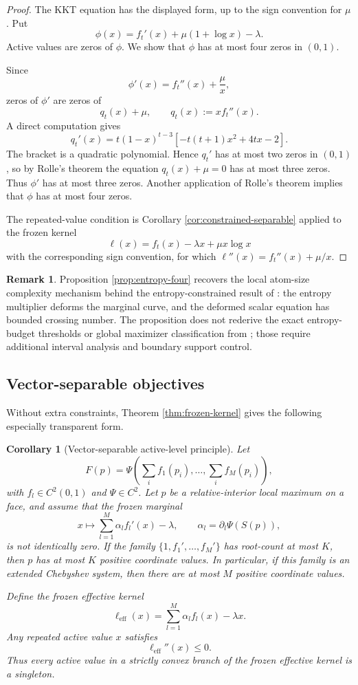 \documentclass[11pt]{article}
\newtheorem{corollary}[theorem]{Corollary}
\theoremstyle{definition}
\newtheorem{remark}[theorem]{Remark}
\begin{document}
\begin{proof}
The KKT equation has the displayed form, up to the sign convention for $\mu$.  Put
\[
  \phi(x)=f_t'(x)+\mu(1+\log x)-\lambda.
\]
Active values are zeros of $\phi$.  We show that $\phi$ has at most four zeros in $(0,1)$.

Since
\[
  \phi'(x)=f_t''(x)+\frac{\mu}{x},
\]
zeros of $\phi'$ are zeros of
\[
  q_t(x)+\mu,
  \qquad
  q_t(x):=x f_t''(x).
\]
A direct computation gives
\[
  q_t'(x)=t(1-x)^{t-3}
  \left[-t(t+1)x^2+4t x-2\right].
\]
The bracket is a quadratic polynomial.  Hence $q_t'$ has at most two zeros in $(0,1)$, so by Rolle's theorem the equation $q_t(x)+\mu=0$ has at most three zeros.  Thus $\phi'$ has at most three zeros.  Another application of Rolle's theorem implies that $\phi$ has at most four zeros.

The repeated-value condition is Corollary \ref{cor:constrained-separable} applied to the frozen kernel
\[
  \ell(x)=f_t(x)-\lambda x+\mu x\log x
\]
with the corresponding sign convention, for which $\ell''(x)=f_t''(x)+\mu/x$.
\end{proof}

\begin{remark}
Proposition \ref{prop:entropy-four} recovers the local atom-size complexity mechanism behind the entropy-constrained result of \cite{BKZ}: the entropy multiplier deforms the marginal curve, and the deformed scalar equation has bounded crossing number.  The proposition does not rederive the exact entropy-budget thresholds or global maximizer classification from \cite{BKZ}; those require additional interval analysis and boundary support control.
\end{remark}

\subsection{Vector-separable objectives}

Without extra constraints, Theorem \ref{thm:frozen-kernel} gives the following especially transparent form.

\begin{corollary}[Vector-separable active-level principle]\label{cor:vector-separable}
Let
\[
  F(p)=\Psi\left(\sum_i f_1(p_i),\ldots,\sum_i f_M(p_i)\right),
\]
with $f_l\in C^2(0,1)$ and $\Psi\in C^2$.  Let $p$ be a relative-interior local maximum on a face, and assume that the frozen marginal
\[
  x\mapsto \sum_{l=1}^M \alpha_l f_l'(x)-\lambda,
  \qquad
  \alpha_l=\partial_l\Psi(S(p)),
\]
is not identically zero.  If the family $\{1,f_1',\ldots,f_M'\}$ has root-count at most $K$, then $p$ has at most $K$ positive coordinate values.  In particular, if this family is an extended Chebyshev system, then there are at most $M$ positive coordinate values.

Define the frozen effective kernel
\[
  \ell_{\mathrm{eff}}(x)=\sum_{l=1}^M\alpha_l f_l(x)-\lambda x.
\]
Any repeated active value $x$ satisfies
\[
  \ell_{\mathrm{eff}}''(x)\le0.
\]
Thus every active value in a strictly convex branch of the frozen effective kernel is a singleton.
\end{corollary}
\end{document}
